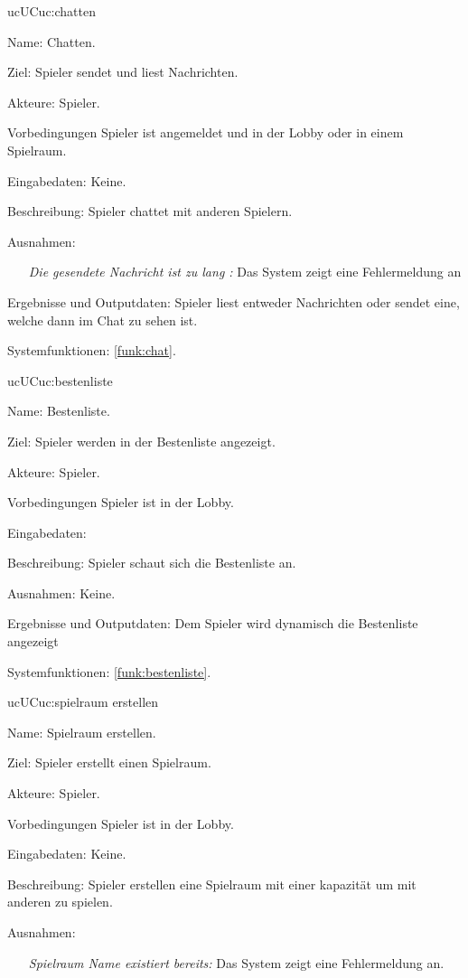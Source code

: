 \begin{description}[leftmargin=5em, style=sameline]
	\begin{lhp}{uc}{UC}{uc:chatten}
		\item [Name:] Chatten.
		\item [Ziel:] Spieler sendet und liest Nachrichten.
		\item [Akteure:] Spieler.
		\item [Vorbedingungen] Spieler ist angemeldet und in der Lobby oder in einem Spielraum.
		\item [Eingabedaten:] Keine.
		\item [Beschreibung:] Spieler chattet mit anderen Spielern.
		\item [Ausnahmen:] \hfill
		\begin{itemize} 
			\item[] \textit{Die gesendete Nachricht ist zu lang :} Das System zeigt eine Fehlermeldung an			
		\end{itemize}
		\item [Ergebnisse und Outputdaten:] Spieler liest entweder Nachrichten oder sendet eine, welche dann im Chat zu sehen ist. 	
		\item [Systemfunktionen:] \ref{funk:chat}.
	\end{lhp}


	\begin{lhp}{uc}{UC}{uc:bestenliste}
		\item [Name:] Bestenliste.
		\item [Ziel:] Spieler werden in der Bestenliste angezeigt.
		\item [Akteure:] Spieler.
		\item [Vorbedingungen] Spieler ist in der Lobby.
		\item [Eingabedaten:] 
		\item [Beschreibung:] Spieler schaut sich die Bestenliste an.
		\item [Ausnahmen:] Keine.
		\item [Ergebnisse und Outputdaten:] Dem Spieler wird dynamisch die Bestenliste angezeigt	
		\item [Systemfunktionen:] \ref{funk:bestenliste}.
	\end{lhp}

	\begin{lhp}{uc}{UC}{uc:spielraum erstellen}
		\item [Name:] Spielraum erstellen.
		\item [Ziel:] Spieler erstellt einen Spielraum.
		\item [Akteure:] Spieler.
		\item [Vorbedingungen] Spieler ist in der Lobby.
		\item [Eingabedaten:] Keine.
		\item [Beschreibung:] Spieler erstellen eine Spielraum mit einer kapazität um mit anderen zu spielen.
		\item [Ausnahmen:] \hfill
		\begin{itemize} 
			\item[] \textit{Spielraum Name existiert bereits:} Das System zeigt eine Fehlermeldung an.
			

\end{itemize}
\end{lhp}
\end{description}
